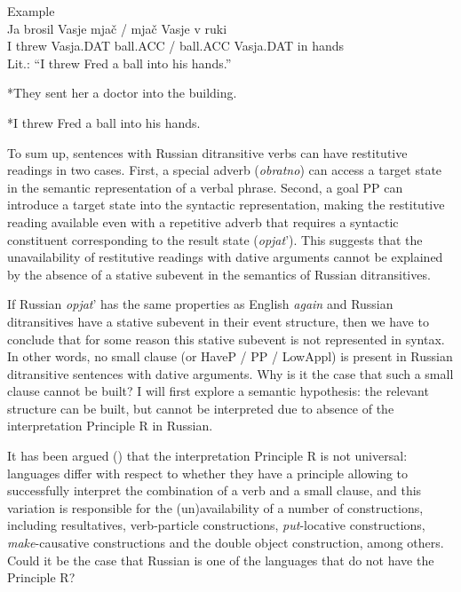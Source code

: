 \documentclass[output=paper,modfonts,nonflat,
 hidelinks
]{langsci/langscibook}
\begin{document}
 \ea\label{ex:bondarenko:}
{Example}\\

\gll Ja brosil Vasje mjač / mjač Vasje v ruki\\
     I threw Vasja.DAT ball.ACC / ball.ACC Vasja.DAT in hands\\
\glt Lit.: “I threw Fred a ball into his hands.”
\z

 \ea\label{ex:bondarenko:}
{*They sent her a doctor into the building.}\\
\z

\begin{quote}
\citep{McIntyre2011}
\end{quote}

 \ea\label{ex:bondarenko:}
{*I threw Fred a ball into his hands.}\\
\z

\begin{quote}
\citep{McIntyre2011}
\end{quote}


To sum up, sentences with Russian ditransitive verbs can have restitutive readings in two cases. First, a special adverb (\textit{obratno}) can access a target state in the semantic representation of a verbal phrase. Second, a goal PP can introduce a target state into the syntactic representation, making the restitutive reading available even with a repetitive adverb that requires a syntactic constituent corresponding to the result state (\textit{opjat}’). This suggests that the unavailability of restitutive readings with dative arguments cannot be explained by the absence of a stative subevent in the semantics of Russian ditransitives.



If Russian \textit{opjat}’ has the same properties as English \textit{again} and Russian ditransitives have a stative subevent in their event structure, then we have to conclude that for some reason this stative subevent is not represented in syntax. In other words, no small clause (or HaveP / PP / LowAppl) is present in Russian ditransitive sentences with dative arguments. Why is it the case that such a small clause cannot be built? I will first explore a semantic hypothesis: the relevant structure can be built, but cannot be interpreted due to absence of the interpretation Principle R in Russian.



It has been argued (\citealt{Snyder2001,BeckSnyder2001,Beck2005}) that the interpretation Principle R is not universal: languages differ with respect to whether they have a principle allowing to successfully interpret the combination of a verb and a small clause, and this variation is responsible for the (un)availability of a number of constructions, including resultatives, verb-particle constructions, \textit{put}{}-locative constructions, \textit{make}{}-causative constructions and the double object construction, among others. Could it be the case that Russian is one of the languages that do not have the Principle R?
\end{document}
